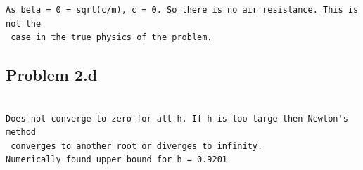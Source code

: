 \documentclass[a4paper,12pt,onecolumn,final]{article}
\begin{document}
\begin{verbatim}
As beta = 0 = sqrt(c/m), c = 0. So there is no air resistance. This is not the
 case in the true physics of the problem.
\end{verbatim}

\subsection*{Problem 2.d}

\begin{verbatim}

Does not converge to zero for all h. If h is too large then Newton's method
 converges to another root or diverges to infinity.
Numerically found upper bound for h = 0.9201

\end{verbatim}


\end{document}
